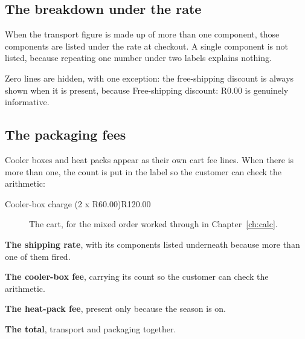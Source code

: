 \documentclass[11pt,a4paper,oneside]{report}
\begin{document}
\subsection{The breakdown under the rate}

When the transport figure is made up of more than one component, those components are
listed under the rate at checkout. A single component is not listed, because
repeating one number under two labels explains nothing.

Zero lines are hidden, with one exception: the free-shipping discount is always shown
when it is present, because \textsf{Free-shipping discount: R0.00} is genuinely
informative.

\subsection{The packaging fees}

Cooler boxes and heat packs appear as their own cart fee lines. When there is more
than one, the count is put in the label so the customer can check the arithmetic:

\begin{center}
\textsf{Cooler-box charge (2 x R60.00)}\hspace{2em}\textsf{R120.00}
\end{center}

\begin{figure}[H]
\centering
{}
\caption{The cart, for the mixed order worked through in
Chapter~\ref{ch:calc}.}
\label{fig:cart-totals}
\end{figure}

\vspace{-8pt}
\begin{description}[leftmargin=1.6em,labelindent=0pt,itemsep=2pt,parsep=0pt,
                    topsep=2pt,font=\normalfont]
  \item {} \textbf{The shipping rate}, with its components listed
    underneath because more than one of them fired.
  \item {} \textbf{The cooler-box fee}, carrying its count so the
    customer can check the arithmetic.
  \item {} \textbf{The heat-pack fee}, present only because the season
    is on.
  \item {} \textbf{The total}, transport and packaging together.
\end{description}
\end{document}
